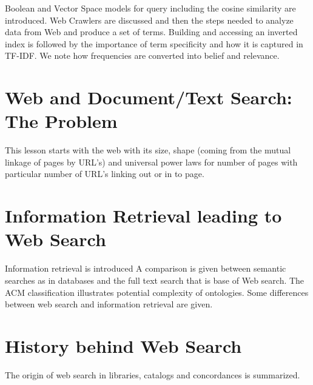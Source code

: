 Boolean and Vector Space models for query including the cosine
similarity are introduced. Web Crawlers are discussed and then the steps
needed to analyze data from Web and produce a set of terms. Building and
accessing an inverted index is followed by the importance of term
specificity and how it is captured in TF-IDF. We note how frequencies
are converted into belief and relevance.


\section{Web and Document/Text Search: The
Problem}\label{web-and-documenttext-search-the-problem}


This lesson starts with the web with its size, shape (coming from the
mutual linkage of pages by URL's) and universal power laws for number of
pages with particular number of URL's linking out or in to page.



\section{Information Retrieval leading to Web
Search}\label{information-retrieval-leading-to-web-search}


Information retrieval is introduced A comparison is given between
semantic searches as in databases and the full text search that is base
of Web search. The ACM classification illustrates potential complexity
of ontologies. Some differences between web search and information
retrieval are given.



\section{History behind Web Search}\label{history-behind-web-search}


The origin of web search in libraries, catalogs and concordances is
summarized.




